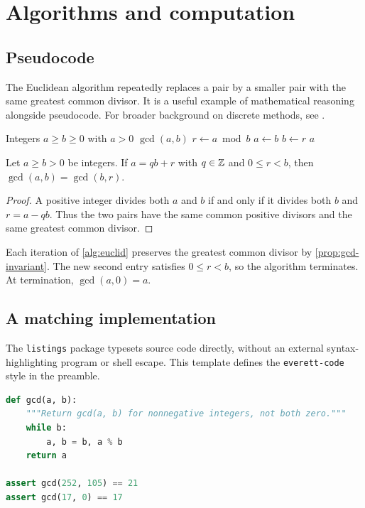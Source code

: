 \documentclass[../../main.tex]{subfiles}
\begin{document}
\chapter{Algorithms and computation}
\label{ch:computation}

\section{Pseudocode}
The Euclidean algorithm repeatedly replaces a pair by a smaller pair with
the same greatest common divisor. It is a useful example of mathematical
reasoning alongside pseudocode. For broader background on discrete methods,
see \textcite{concrete1994}.

\begin{algorithm}[htbp]
  \caption{Euclidean algorithm}
  \label{alg:euclid}
  \begin{algorithmic}[1]
    \Require Integers $a\ge b\ge0$ with $a>0$
    \Ensure $\gcd(a,b)$
      \State $r\gets a\bmod b$
      \State $a\gets b$
      \State $b\gets r$
    \EndWhile
    \State \Return $a$
  \end{algorithmic}
\end{algorithm}

\begin{prop}\label{prop:gcd-invariant}
Let $a\ge b>0$ be integers. If $a=qb+r$ with $q\in\mathbb Z$ and
$0\le r<b$, then $\gcd(a,b)=\gcd(b,r)$.
\end{prop}
\begin{proof}
A positive integer divides both $a$ and $b$ if and only if it divides both
$b$ and $r=a-qb$. Thus the two pairs have the same common positive divisors
and the same greatest common divisor.
\end{proof}

Each iteration of \cref{alg:euclid} preserves the greatest common divisor
by \cref{prop:gcd-invariant}. The new second entry satisfies $0\le r<b$, so
the algorithm terminates. At termination, $\gcd(a,0)=a$.

\clearpage
\section{A matching implementation}
The \texttt{listings} package typesets source code directly, without an
external syntax-highlighting program or shell escape. This template defines
the \texttt{everett-code} style in the preamble.

\begin{lstlisting}[language=Python,caption={Computing a greatest common divisor},label={lst:gcd}]
def gcd(a, b):
    """Return gcd(a, b) for nonnegative integers, not both zero."""
    while b:
        a, b = b, a % b
    return a

assert gcd(252, 105) == 21
assert gcd(17, 0) == 17
\end{lstlisting}
\end{document}
